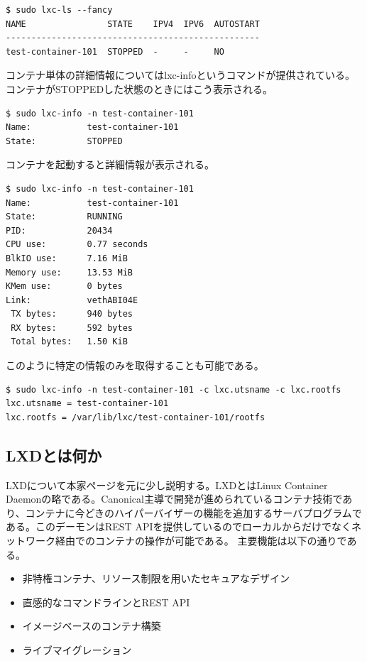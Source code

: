 ﻿\documentclass[9pt,b5paper,tombo,openany]{jsbook}
\begin{document}
\begin{lstlisting}
$ sudo lxc-ls --fancy
NAME                STATE    IPV4  IPV6  AUTOSTART
--------------------------------------------------
test-container-101  STOPPED  -     -     NO
\end{lstlisting}

\noindent
コンテナ単体の詳細情報についてはlxc-infoというコマンドが提供されている。コンテナがSTOPPEDした状態のときにはこう表示される。

\begin{lstlisting}
$ sudo lxc-info -n test-container-101
Name:           test-container-101
State:          STOPPED
\end{lstlisting}

\noindent
コンテナを起動すると詳細情報が表示される。

\begin{lstlisting}
$ sudo lxc-info -n test-container-101
Name:           test-container-101
State:          RUNNING
PID:            20434
CPU use:        0.77 seconds
BlkIO use:      7.16 MiB
Memory use:     13.53 MiB
KMem use:       0 bytes
Link:           vethABI04E
 TX bytes:      940 bytes
 RX bytes:      592 bytes
 Total bytes:   1.50 KiB
\end{lstlisting}


\noindent
このように特定の情報のみを取得することも可能である。

\begin{lstlisting}
$ sudo lxc-info -n test-container-101 -c lxc.utsname -c lxc.rootfs
lxc.utsname = test-container-101
lxc.rootfs = /var/lib/lxc/test-container-101/rootfs
\end{lstlisting}

\newpage

\subsection{LXDとは何か}
LXDについて本家ページを元に少し説明する。LXDとはLinux Container Daemonの略である。Canonical主導で開発が進められているコンテナ技術であり、コンテナに今どきのハイパーバイザーの機能を追加するサーバプログラムである。このデーモンはREST APIを提供しているのでローカルからだけでなくネットワーク経由でのコンテナの操作が可能である。
\noindent
主要機能は以下の通りである。
\begin{itemize}
	\item 非特権コンテナ、リソース制限を用いたセキュアなデザイン
	\item 直感的なコマンドラインとREST API
	\item イメージベースのコンテナ構築
	\item ライブマイグレーション
\end{itemize}
\end{document}
